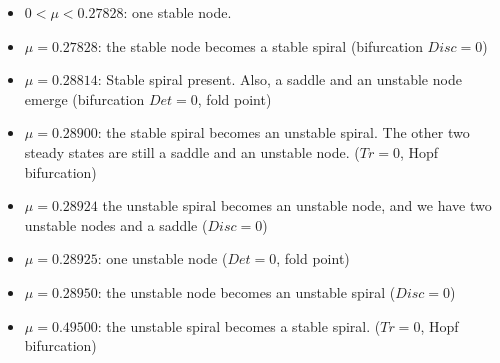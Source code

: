 \begin{itemize}
\item $0 <\mu< 0.27828$: one stable node.
\item $\mu = 0.27828$: the stable node becomes a stable spiral (bifurcation $Disc = 0$)
\item $\mu = 0.28814$: Stable spiral present. Also, a saddle and an unstable node
emerge (bifurcation $Det = 0$, {fold point})
\item $\mu = 0.28900$: the stable spiral becomes an unstable spiral. The other two steady states are still a saddle and an unstable node. ($Tr=0$, Hopf bifurcation)
\item $\mu = 0.28924$ the unstable spiral becomes an unstable node, and we have two
unstable nodes and a saddle ($Disc = 0$)
\item $\mu = 0.28925$: one unstable node ($Det = 0$, {fold point})
\item $\mu = 0.28950$: the unstable node becomes an unstable spiral ($Disc = 0$)
\item $\mu = 0.49500$: the unstable spiral becomes a stable spiral. ($Tr=0$, Hopf bifurcation)
\end{itemize}


